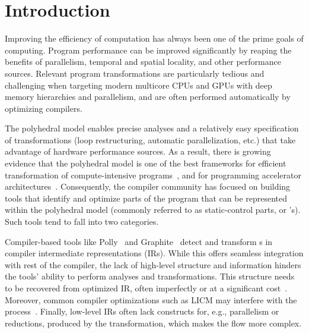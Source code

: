 
\section{Introduction}

Improving the efficiency of computation has always been one of the prime goals of computing.
Program performance can be improved significantly by reaping the benefits of parallelism, temporal and spatial locality, and other performance sources. Relevant program transformations are particularly tedious and challenging when targeting modern multicore CPUs and GPUs with deep memory hierarchies and parallelism, and are often performed automatically by optimizing compilers.

The polyhedral model enables precise analyses and a relatively easy specification of transformations (loop restructuring, automatic parallelization, etc.) that take advantage of hardware performance sources.  As a result, there is growing evidence that the polyhedral model is one of the best frameworks for efficient transformation of compute-intensive programs~\cite{tc,teckyl,mullapudi2015polymage},
and for programming accelerator architectures~\cite{cerebras_chip,ppcg,tc_cim}. Consequently, the compiler community has focused on building tools that identify and optimize parts of the program that can be represented within the polyhedral model (commonly referred to as static-control parts, or \scop's). Such tools tend to fall into two categories.


Compiler-based tools like Polly~\cite{grosser.ppl.2012} and Graphite~\cite{pop2006graphite} detect and transform {\scop}s in compiler intermediate representations (IRs). While this offers seamless integration with rest of the compiler, the lack of high-level structure and information hinders the tools' ability to perform analyses and transformations. This structure needs to be recovered from optimized IR, often imperfectly or at a significant cost~\cite{delinearization}. Moreover, common compiler optimizations such as LICM may interfere with the process~\cite{delicm}. Finally, low-level IRs often lack constructs for, e.g., parallelism or reductions, produced by the transformation, which makes the flow more complex.

